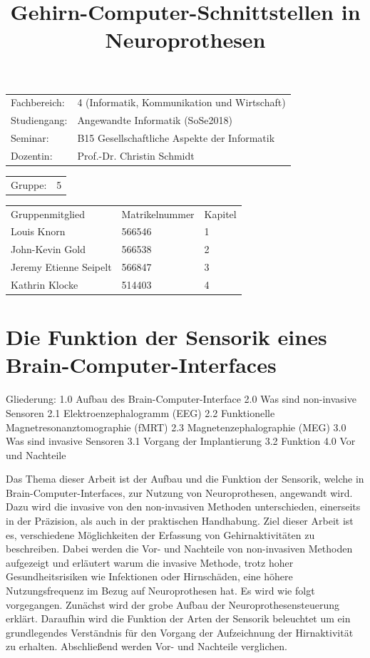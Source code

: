 \documentclass[11pt,ngerman,parskip=half]{scrartcl}
\author{}
\title{Gehirn-Computer-Schnittstellen in Neuroprothesen}
\begin{document}
\maketitle
\begin{tabular}{ll}
  Fachbereich: & 4 (Informatik, Kommunikation und Wirtschaft) \\
  Studiengang: & Angewandte Informatik (SoSe2018)             \\
  Seminar:     & B15 Gesellschaftliche Aspekte der Informatik \\
  Dozentin:    & Prof.-Dr. Christin Schmidt                   \\
\end{tabular}

\begin{tabular}{ll}
  Gruppe: & 5 \\
\end{tabular}

\begin{tabular}{lll}
  Gruppenmitglied        & Matrikelnummer & Kapitel\\
  Louis Knorn            & 566546         & 1\\
  John-Kevin Gold        & 566538         & 2\\
  Jeremy Etienne Seipelt & 566847         & 3\\
  Kathrin Klocke         & 514403         & 4\\
\end{tabular}

\newpage
\tableofcontents
\newpage
\listoffigures
\newpage
\newpage
\section{Die Funktion der Sensorik eines Brain-Computer-Interfaces}

Gliederung:
1.0 Aufbau des Brain-Computer-Interface
2.0 Was sind non-invasive Sensoren
2.1 Elektroenzephalogramm (EEG)
2.2 Funktionelle Magnetresonanztomographie (fMRT)
2.3 Magnetenzephalographie (MEG)
3.0 Was sind invasive Sensoren
3.1 Vorgang der Implantierung
3.2 Funktion
4.0 Vor und Nachteile

Das Thema dieser Arbeit ist der Aufbau und die Funktion der Sensorik, welche in Brain-Computer-Interfaces, zur Nutzung von Neuroprothesen, angewandt wird. Dazu wird die invasive von den non-invasiven Methoden unterschieden, einerseits in der Präzision, als auch in der praktischen Handhabung. 
Ziel dieser Arbeit ist es, verschiedene Möglichkeiten der Erfassung von Gehirnaktivitäten zu beschreiben. Dabei werden die Vor- und Nachteile von non-invasiven Methoden aufgezeigt und erläutert warum die invasive Methode, trotz hoher Gesundheitsrisiken wie Infektionen oder Hirnschäden, eine höhere Nutzungsfrequenz im Bezug auf Neuroprothesen hat. 
Es wird wie folgt vorgegangen. Zunächst wird der grobe Aufbau der Neuroprothesensteuerung erklärt. Daraufhin wird die Funktion der Arten der Sensorik beleuchtet um ein grundlegendes Verständnis für den Vorgang der Aufzeichnung der Hirnaktivität zu erhalten. Abschließend werden Vor- und Nachteile verglichen.
\end{document}
